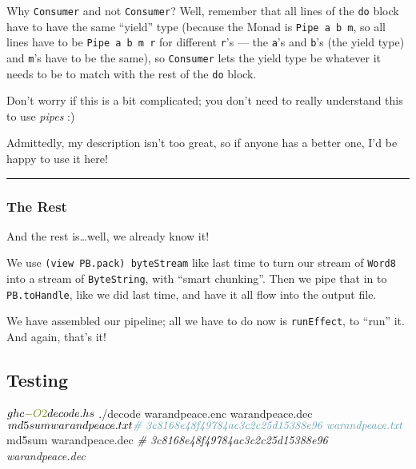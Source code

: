 \documentclass[]{article}
\newenvironment{Shaded}{}{}
\newcommand{\AttributeTok}[1]{\textcolor[rgb]{0.49,0.56,0.16}{#1}}
\newcommand{\CommentTok}[1]{\textcolor[rgb]{0.38,0.63,0.69}{\textit{#1}}}
\newcommand{\ExtensionTok}[1]{#1}
\newcommand{\NormalTok}[1]{#1}
\begin{document}
Why \texttt{Consumer\textquotesingle{}} and not \texttt{Consumer}? Well,
remember that all lines of the \texttt{do} block have to have the same ``yield''
type (because the Monad is \texttt{Pipe\ a\ b\ m}, so all lines have to be
\texttt{Pipe\ a\ b\ m\ r} for different \texttt{r}'s --- the \texttt{a}'s and
\texttt{b}'s (the yield type) and \texttt{m}'s have to be the same), so
\texttt{Consumer\textquotesingle{}} lets the yield type be whatever it needs to
be to match with the rest of the \texttt{do} block.

Don't worry if this is a bit complicated; you don't need to really understand
this to use \emph{pipes} :)

Admittedly, my description isn't too great, so if anyone has a better one, I'd
be happy to use it here!

\begin{center}\rule{0.5\linewidth}{0.5pt}\end{center}

\subsubsection{The Rest}\label{the-rest}

And the rest is\ldots well, we already know it!

We use \texttt{(view\ PB.pack)\ byteStream} like last time to turn our stream of
\texttt{Word8} into a stream of \texttt{ByteString}, with ``smart chunking''.
Then we pipe that in to \texttt{PB.toHandle}, like we did last time, and have it
all flow into the output file.

We have assembled our pipeline; all we have to do now is \texttt{runEffect}, to
``run'' it. And again, that's it!

\subsection{Testing}\label{testing}

\begin{Shaded}
\begin{Highlighting}[]
\ExtensionTok{$}\NormalTok{ ghc }\AttributeTok{{-}O2}\NormalTok{ decode.hs}
\ExtensionTok{$}\NormalTok{ ./decode warandpeace.enc warandpeace.dec}
\ExtensionTok{$}\NormalTok{ md5sum warandpeace.txt}
\CommentTok{\# 3c8168e48f49784ac3c2c25d15388e96  warandpeace.txt}
\ExtensionTok{$}\NormalTok{ md5sum warandpeace.dec}
\CommentTok{\# 3c8168e48f49784ac3c2c25d15388e96  warandpeace.dec}
\end{Highlighting}
\end{Shaded}
\end{document}
